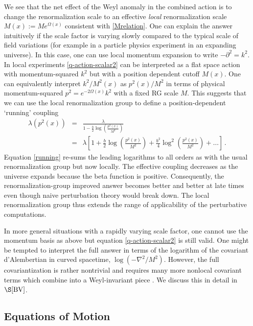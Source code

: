\documentclass[12pt,a4paper]{article}
\newcommand{\bea}{\begin{eqnarray}}
\newcommand{\eea}{\end{eqnarray}}
\renewcommand{\l}{\lambda}
\newcommand{\1}{{\textbf{1}}}
\newcommand{\+}{{\,+ \,}}
\begin{document}
We see that the net effect of the Weyl anomaly in the combined action is to change the renormalization scale to an effective \textit{local} renormalization scale $M(x) := Me^{\Omega(x)}$ consistent with \eqref{Mrelation}. One can explain the answer intuitively if the scale factor is varying slowly  compared to the typical scale of field variations (for example in a particle physics experiment in an expanding universe). In this case, one can use local momentum expansion to write $-\partial^{2} = k^{2}$.  In local experiments  \eqref{q-action-scalar2} can be interpreted as a flat space action with momentum-squared $k^{2}$ but with a  position dependent cutoff $M(x)$. 
One can equivalently interpret $k^{2}/M^{2}(x)$ as $p^{2}(x)/M^{2}$ in terms of physical momentum-squared  $p^{2}= e^{-2\Omega(x)}k^{2}$ with a fixed RG scale $M$.
This suggests that we can use the local renormalization group to define a position-dependent `running' coupling
\bea\label{running}
\l(p^{2}(x)) &=& \frac{\l}{1- \frac{b}{2}\log \left(\frac{p^{2}(x)}{M^{2}}\right)} \, \\
&=& \l \left[ {1+  \frac{b}{2}\log \left(\frac{p^{2}(x)}{M^{2}}\right)}+ \frac{b^{2}}{4}
\log ^{2}\left(\frac{p^{2}(x)}{M^{2}}\right) + \ldots\right] \, .
\eea
Equation \eqref{running} re-sums the leading logarithms to all orders as with the usual renormalization group but now locally.
The  effective coupling  decreases as the universe expands because the beta function is positive. Consequently, the renormalization-group improved answer becomes better and better at late times even though naive perturbation theory would break down. 
The local renormalization group thus extends the range of applicability of the perturbative computations. 

In more general situations with a rapidly varying scale factor, one cannot use the momentum basis as above but equation \eqref{q-action-scalar2} is still valid. One might be tempted to interpret the full answer in terms of the logarithm of the covariant d’Alembertian in curved spacetime, $\log \left({-\nabla^{2}}/{M^{2}}\right)$. However, the full covariantization is rather nontrivial and requires many more nonlocal covariant terms which combine into a Weyl-invariant piece \cite{Barvinsky:1995it, Donoghue:2015nba}.  We discuss this in detail in $\S\ref{BV}$. 

\subsection{Equations of Motion \label{EM}}
\end{document}
